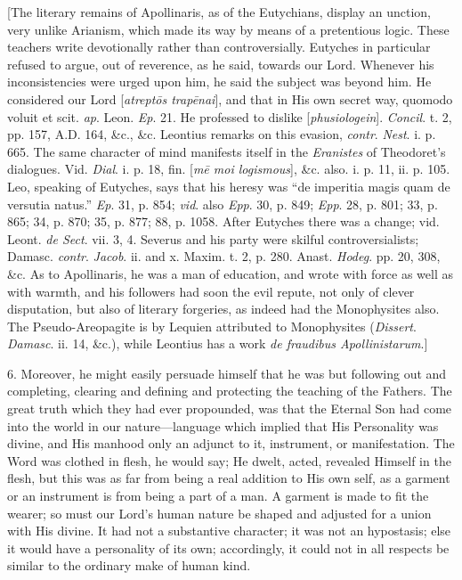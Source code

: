 [The literary remains of Apollinaris, as of the Eutychians, display
an unction, very unlike Arianism, which made its way by means of a
pretentious logic. These teachers write devotionally rather than
controversially. Eutyches in particular refused to argue, out of
reverence, as he said, towards our Lord. Whenever his inconsistencies
were urged upon him, he said the subject was beyond him. He considered
our Lord [\emph{atrept\={o}s trap\={e}nai}], and that in His own
secret way, quomodo voluit et scit. \emph{ap}. Leon. \emph{Ep}. 21. He
professed to dislike [\emph{phusiologein}]. \emph{Concil}. t. 2, pp.
157, A.D. 164, \&c.,
\&c. Leontius remarks on this evasion, \emph{contr}. \emph{Nest}. i.
p. 665. The same character of mind manifests itself in the \emph{Eranistes}
of Theodoret's dialogues. Vid. \emph{Dial}. i. p. 18, fin. [\emph{m\={e}
moi logismous}], \&c. also. i. p. 11, ii. p. 105. Leo, speaking
of Eutyches, says that his heresy was ``de imperitia magis quam de
versutia natus.'' \emph{Ep}. 31, p. 854; \emph{vid}. also \emph{Epp}.
30, p. 849; \emph{Epp}. 28, p. 801; 33, p. 865; 34, p. 870; 35, p.
877; 88, p. 1058. After Eutyches there was a change; vid. Leont. \emph{de
Sect}. vii. 3, 4. Severus and his party were skilful
controversialists; Damasc. \emph{contr}. \emph{Jacob}. ii. and x.
Maxim. t. 2, p. 280. Anast. \emph{Hodeg}. pp. 20, 308, \&c. As to
Apollinaris, he was a man of education, and wrote with force as well
as with warmth, and his followers had soon the evil repute, not only
of clever disputation, but also of literary forgeries, as indeed had
the Monophysites also. The Pseudo-Areopagite is by Lequien attributed
to Monophysites (\emph{Dissert}. \emph{Damasc}. ii. 14, \&c.),
while Leontius has a work \emph{de fraudibus Apollinistarum}.]

6. Moreover, he might easily persuade himself that he was but
following out and completing, clearing and defining and
protecting the teaching of the Fathers. The great truth which they had
ever propounded, was that the Eternal Son had come into the world in
our nature—language which implied that His Personality was divine,
and His manhood only an adjunct to it, instrument, or manifestation.
The Word was clothed in flesh, he would say; He dwelt, acted, revealed
Himself in the flesh, but this was as far from being a real addition
to His own self, as a garment or an instrument is from being a part of
a man. A garment is made to fit the wearer; so must our Lord's human
nature be shaped and adjusted for a union with His divine. It had not
a substantive character; it was not an hypostasis; else it would have
a personality of its own; accordingly, it could not in all respects be
similar to the ordinary make of human kind.

